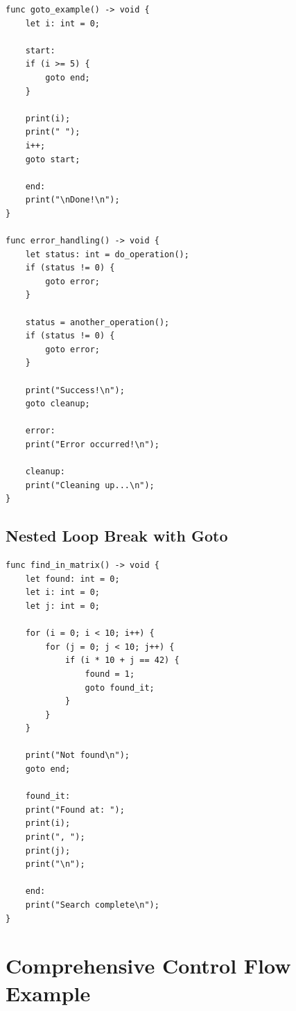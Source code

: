 \documentclass[12pt,a4paper,oneside]{book}
\begin{document}
\begin{lstlisting}[style=algo, caption={Goto and Labels}]
func goto_example() -> void {
    let i: int = 0;
    
    start:
    if (i >= 5) {
        goto end;
    }
    
    print(i);
    print(" ");
    i++;
    goto start;
    
    end:
    print("\nDone!\n");
}

func error_handling() -> void {
    let status: int = do_operation();
    if (status != 0) {
        goto error;
    }
    
    status = another_operation();
    if (status != 0) {
        goto error;
    }
    
    print("Success!\n");
    goto cleanup;
    
    error:
    print("Error occurred!\n");
    
    cleanup:
    print("Cleaning up...\n");
}
\end{lstlisting}

\subsection{Nested Loop Break with Goto}

\begin{lstlisting}[style=algo, caption={Breaking Nested Loops}]
func find_in_matrix() -> void {
    let found: int = 0;
    let i: int = 0;
    let j: int = 0;
    
    for (i = 0; i < 10; i++) {
        for (j = 0; j < 10; j++) {
            if (i * 10 + j == 42) {
                found = 1;
                goto found_it;
            }
        }
    }
    
    print("Not found\n");
    goto end;
    
    found_it:
    print("Found at: ");
    print(i);
    print(", ");
    print(j);
    print("\n");
    
    end:
    print("Search complete\n");
}
\end{lstlisting}

\section{Comprehensive Control Flow Example}
\end{document}
